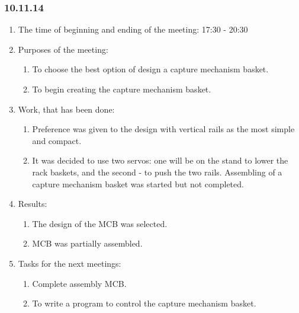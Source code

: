 
\subsubsection{10.11.14}

\begin{enumerate} 
	\item The time of beginning and ending of the meeting:
	17:30 - 20:30
	\item Purposes of the meeting:
	\begin{enumerate}
		\item To choose the best option of design a capture mechanism basket.
		
		\item To begin creating the capture mechanism basket.
		
	\end{enumerate}
	
	\item Work, that has been done:
	\begin{enumerate}
		\item Preference was given to the design with vertical rails as the most simple and compact.
		
		\item It was decided to use two servos: one will be on the stand to lower the rack baskets, and the second - to push the two rails. Assembling of a capture mechanism basket was started but not completed.
		
		
	\end{enumerate}
	
	\item Results:  
	\begin{enumerate}
		\item The design of the MCB was selected.
		
		\item MCB was partially assembled.
		
	\end{enumerate}
	
	\item Tasks for the next meetings:
	\begin{enumerate}
		\item Complete assembly MCB.
		
		\item To write a program to control the capture mechanism basket.
		
	\end{enumerate}     
\end{enumerate}
\fillpage

